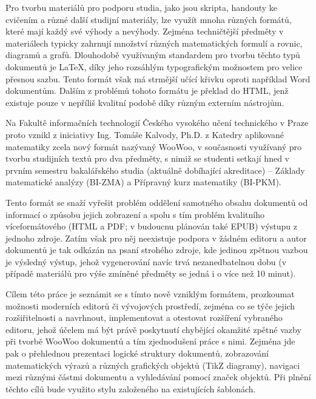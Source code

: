 Pro tvorbu materiálů pro podporu studia, jako jsou skripta, handouty ke cvičením a různé další studijní materiály, lze
využít mnoha různých formátů, které mají každý své výhody a nevýhody. Zejména techničtější předměty v materiálech
typicky zahrnují množství různých matematických formulí a rovnic, diagramů a grafů. Dlouhodobě využívaným standardem pro
tvorbu těchto typů dokumentů je LaTeX, díky jeho rozsáhlým typografickým možnostem pro velice přesnou sazbu. Tento
formát však má strmější učící křivku oproti například Word dokumentům. Dalším z problémů tohoto formátu je překlad do
HTML, jenž existuje pouze v nepříliš kvalitní podobě díky různým externím nástrojům.

Na Fakultě informačních technologií Českého vysokého učení technického v Praze proto vznikl z iniciativy Ing. Tomáše
Kalvody, Ph.D. z Katedry aplikované matematiky zcela nový formát nazývaný WooWoo, v současnosti využívaný pro tvorbu
studijních textů pro dva předměty, s nimiž se studenti setkají hned v prvním semestru bakalářského studia (aktuálně
dobíhající akreditace) – Základy matematické analýzy (BI-ZMA) a Přípravný kurz matematiky (BI-PKM).

Tento formát se snaží vyřešit problém oddělení samotného obsahu dokumentů od informací o způsobu jejich zobrazení a
spolu s tím problém kvalitního víceformátového (HTML a PDF; v budoucnu plánován také EPUB) výstupu z jednoho zdroje.
Zatím však pro něj neexistuje podpora v žádném editoru a autor dokumentů je tak odkázán na psaní strohého zdroje, kde
jedinou zpětnou vazbou je výsledný výstup, jehož vygenerování navíc trvá nezanedbatelnou dobu (v případě materiálů pro
výše zmíněné předměty se jedná i o více než 10 minut).

Cílem této práce je seznámit se s tímto nově vzniklým formátem, prozkoumat možnosti moderních editorů či vývojových
prostředí, zejména co se týče jejich rozšiřitelnosti a navrhnout, implementovat a otestovat rozšíření vybraného editoru,
jehož účelem má být právě poskytnutí chybějící okamžité zpětné vazby při tvorbě WooWoo dokumentů a tím zjednodušení
práce s nimi. Zejména jde pak o přehlednou prezentaci logické struktury dokumentů, zobrazování matematických výrazů a
různých grafických objektů (TikZ diagramy), navigaci mezi různými částmi dokumentu a vyhledávání pomocí značek objektů.
Při plnění těchto cílů bude využito stylu založeného na existujících šablonách.
